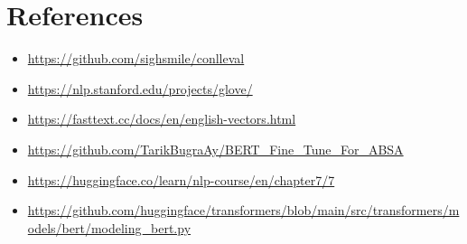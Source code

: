 \documentclass{article}
\begin{document}
\section{References}
\begin{itemize}
    \item \href{https://github.com/sighsmile/conlleval}{https://github.com/sighsmile/conlleval}
    \item \href{https://nlp.stanford.edu/projects/glove/}{https://nlp.stanford.edu/projects/glove/}
    \item \href{https://fasttext.cc/docs/en/english-vectors.html}{https://fasttext.cc/docs/en/english-vectors.html}
    \item \href{https://github.com/TarikBugraAy/BERT_Fine_Tune_For_ABSA}{https://github.com/TarikBugraAy/BERT\_Fine\_Tune\_For\_ABSA}
    \item \href{https://huggingface.co/learn/nlp-course/en/chapter7/7}{https://huggingface.co/learn/nlp-course/en/chapter7/7}
    \item \href{https://github.com/huggingface/transformers/blob/main/src/transformers/models/bert/modeling_bert.py}{https://github.com/huggingface/transformers/blob/main/src/transformers/models/bert/modeling_bert.py }
\end{itemize}
\end{document}
